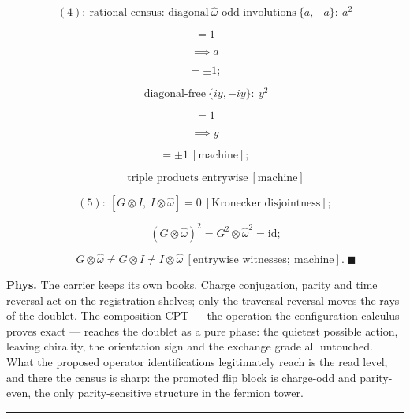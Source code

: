 \begin{theorem}
\[
(4):\ \text{rational census: diagonal}\ \hat\omega\text{-odd involutions}\ \{a,-a\}:\ a^2
\]

\[
= 1
\]

\[
\implies a
\]

\[
= \pm1;
\]

\[
\ \text{diagonal-free}\ \{iy,-iy\}:\ y^2
\]

\[
= 1
\]

\[
\implies y
\]

\[
= \pm1\ [\text{machine}];
\]

\[
\qquad \text{triple products entrywise}\ [\text{machine}]
\]

\[
(5):\ [G\otimes I,\ I\otimes\hat\omega]=0\ [\text{Kronecker disjointness}];
\]

\[
\qquad (G\otimes\hat\omega)^2=G^2\otimes\hat\omega^2=\mathrm{id};
\]

\[
\qquad G\otimes\hat\omega\ne G\otimes I\ne I\otimes\hat\omega\ [\text{entrywise witnesses};\ \text{machine}].\ \blacksquare
\]

\textbf{Phys.} The carrier keeps its own books. Charge conjugation, parity and time reversal act on the registration shelves; only the traversal reversal moves the rays of the doublet. The composition CPT — the operation the configuration calculus proves exact — reaches the doublet as a pure phase: the quietest possible action, leaving chirality, the orientation sign and the exchange grade all untouched. What the proposed operator identifications legitimately reach is the read level, and there the census is sharp: the promoted flip block is charge-odd and parity-even, the only parity-sensitive structure in the fermion tower.

\vspace{2pt}\noindent\rule{\textwidth}{0.4pt}\vspace{2pt}

\end{theorem}

